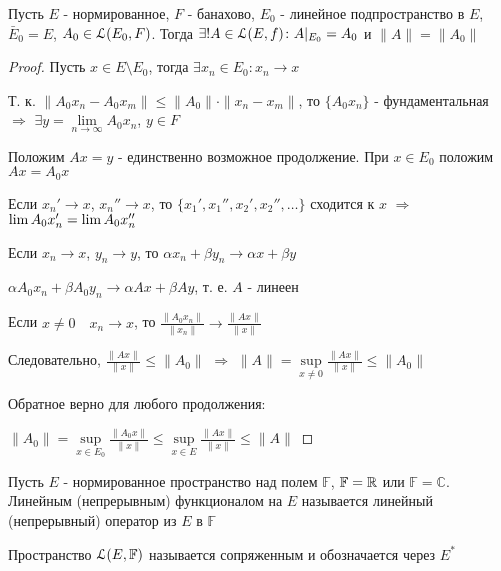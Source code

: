 \documentclass[a4paper,12pt]{report}
\newcommand*{\hm}[1]{#1\nobreak\discretionary{}%
            {\hbox{$\mathsurround=0pt #1$}}{}}
\begin{document}
\begin{thm} Пусть $E$ - нормированное, $F$ - банахово, $E_0$ - линейное подпространство в $E$, $\bar E_0=E$, $A_0\hm\in\EuScript L(E_0,F)$. Тогда $\exists!A\in\EuScript L(E,f)\colon A|_{E_0}=A_0$ и $\|A\|=\|A_0\|$
\end{thm}
\begin{proof}
Пусть $x\in E\setminus E_0$, тогда $\exists x_n\in E_0\colon x_n\to x$

Т. к. $\|A_0 x_n-A_0 x_m\|\le\|A_0\|\cdot\|x_n-x_m\|$, то $\{A_0 x_n\}$ - фундаментальная $\Rightarrow$ $\exists y=\lim\limits_{n\to\infty} A_0 x_n$, $y\in F$

Положим $Ax=y$ - единственно возможное продолжение. При $x\in E_0$ положим $Ax=A_0 x$

Если $x_n'\to x$, $x_n''\to x$, то $\{x_1',x_1'',x_2',x_2'',\ldots\}$ сходится к $x$ $\Rightarrow$ $\lim A_0 x_n'\hm=\lim A_0 x_n''$

Если $x_n\to x$, $y_n\to y$, то $\alpha x_n+\beta y_n\to\alpha x+\beta y$

$\alpha A_0 x_n+\beta A_0 y_n\to\alpha Ax+\beta Ay$, т. е. $A$ - линеен

Если $x\ne0\quad x_n\to x$, то $\displaystyle\frac{\|A_0 x_n\|}{\|x_n\|}\to\displaystyle\frac{\|Ax\|}{\|x\|}$

Следовательно, $\displaystyle\frac{\|Ax\|}{\|x\|}\le\|A_0\|$ $\Rightarrow$ $\|A\|=\sup\limits_{x\ne0}\displaystyle\frac{\|Ax\|}{\|x\|}\le\|A_0\|$

Обратное верно для любого продолжения:

 $\|A_0\|=\sup\limits_{x\in E_0}\displaystyle\frac{\|A_0 x\|}{\|x\|}\le\sup\limits_{x\in E}\displaystyle\frac{\|Ax\|}{\|x\|}\le\|A\|$
\end{proof}
 


\begin{df} Пусть $E$ - нормированное пространство над полем $\mathbb F$, $\mathbb F\hm=\mathbb R$ или $\mathbb F=\mathbb C$. Линейным (непрерывным) функционалом на $E$ называется линейный (непрерывный) оператор из $E$ в $\mathbb F$

Пространство $\EuScript L(E,\mathbb F)$ называется сопряженным и обозначается через $E^*$
\end{df}
 
\end{document}
